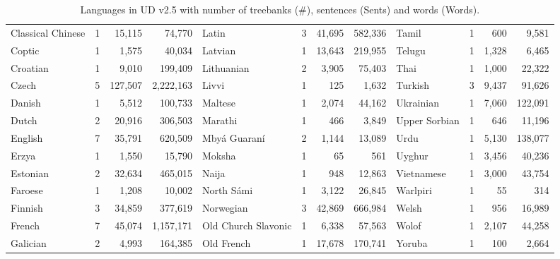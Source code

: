 \begin{table}[t]{}
\begin{adjustbox}{center,scale=0.85}
\begin{tabular}{|lrrr|lrrr|lrrr|}
Classical Chinese &1 &15,115 &74,770 &Latin &3 &41,695 &582,336 &Tamil &1 &600 &9,581 \\
Coptic &1 &1,575 &40,034 &Latvian &1 &13,643 &219,955 &Telugu &1 &1,328 &6,465 \\
Croatian &1 &9,010 &199,409 &Lithuanian &2 &3,905 &75,403 &Thai &1 &1,000 &22,322 \\
Czech &5 &127,507 &2,222,163 &Livvi &1 &125 &1,632 &Turkish &3 &9,437 &91,626 \\
Danish &1 &5,512 &100,733 &Maltese &1 &2,074 &44,162 &Ukrainian &1 &7,060 &122,091 \\
Dutch &2 &20,916 &306,503 &Marathi &1 &466 &3,849 &Upper Sorbian &1 &646 &11,196 \\
English &7 &35,791 &620,509 &Mby\'a Guaran\'i &2 &1,144 &13,089 &Urdu &1 &5,130 &138,077 \\
Erzya &1 &1,550 &15,790 &Moksha &1 &65 &561 &Uyghur &1 &3,456 &40,236 \\
Estonian &2 &32,634 &465,015 &Naija &1 &948 &12,863 &Vietnamese &1 &3,000 &43,754 \\
Faroese &1 &1,208 &10,002 &North S\'ami &1 &3,122 &26,845 &Warlpiri &1 &55 &314 \\
Finnish &3 &34,859 &377,619 &Norwegian &3 &42,869 &666,984 &Welsh &1 &956 &16,989 \\
French &7 &45,074 &1,157,171 &Old Church Slavonic &1 &6,338 &57,563 &Wolof &1 &2,107 &44,258 \\
Galician &2 &4,993 &164,385 &Old French &1 &17,678 &170,741 &Yoruba &1 &100 &2,664 \\
\hline
    \end{tabular}
\end{adjustbox}
    \caption{Languages in UD v2.5 with number of treebanks (\#), sentences (Sents) and words (Words).}
    \label{tab:treebanks}
\end{table}